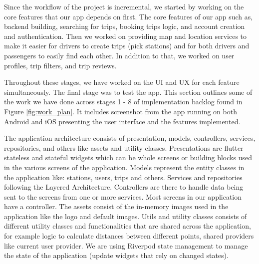\documentclass[a4paper, 12pt]{report} %
\begin{document}
            Since the workflow of the project is incremental, we started by working on the core features that our app depends on first. The core features of our app such as, backend building, searching for trips, booking trips logic, and account creation and authentication. Then we worked on providing map and location services to make it easier for drivers to create trips (pick stations) and for both drivers and passengers to easily find each other. In addition to that, we worked on user profiles, trip filters, and trip reviews. 
            
            Throughout these stages, we have worked on the UI and UX for each feature simultaneously. The final stage was to test the app. This section outlines some of the work we have done across stages 1 - 8 of implementation backlog found in Figure \ref{fig:work_plan}. It includes screenshot from the app running on both Android and iOS presenting the user interface and the features implemented.

            The application architecture consists of presentation, models, controllers, services, repositories, and others like assets and utility classes. Presentations are flutter stateless and stateful widgets which can be whole screens or building blocks used in the various screens of the application. Models represent the entity classes in the application like: stations, users, trips and others. Services and repositories following the Layered Architecture. Controllers are there to handle data being sent to the screens from one or more services. Most screens in our application have a controller. The assets consist of the in-memory images used in the application like the logo and default images. Utils and utility classes consists of different utility classes and functionalities that are shared across the application, for example logic to calculate distances between different points, shared providers like current user provider. We are using Riverpod state management to manage the state of the application (update widgets that rely on changed states).

        \pagebreak
\end{document}
